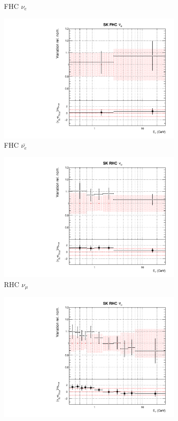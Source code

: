 \begin{figure}[!htbp]
\begin{subfigure}{0.45\textwidth}
  \caption{\SK FHC $\nu_{e}$}
\end{subfigure}
\begin{subfigure}{0.45\textwidth}
  \centering
  \includegraphics[width=0.75\linewidth]{figs/datflux11}
  \caption{\SK FHC $\bar{\nu_{e}}$}
\end{subfigure}
\begin{subfigure}{0.45\textwidth}
  \centering
  \includegraphics[width=0.75\linewidth]{figs/datflux12}
  \caption{\SK RHC $\nu_{\mu}$}
\end{subfigure}
\begin{subfigure}{0.45\textwidth}
  \centering
  \includegraphics[width=0.75\linewidth]{figs/datflux13}

\end{subfigure}
\end{figure}
